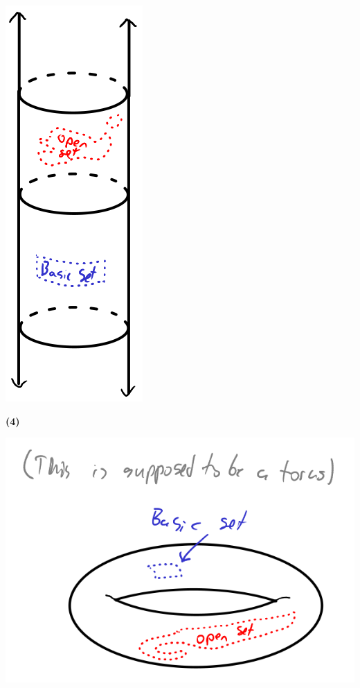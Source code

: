 \documentclass[12pt]{report}
\begin{document}
	\begin{center}\includegraphics{pic6.png}\end{center}

\textbf{(4)}

	\begin{center}\includegraphics{pic7.png}\end{center}
\end{document}
